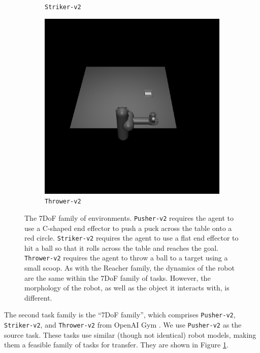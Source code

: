 \begin{subappendices}
\begin{figure}[h]
\begin{subfigure}[t]{0.3\textwidth}
    \caption{\texttt{Striker-v2}}
\end{subfigure}
\begin{subfigure}[t]{0.3\textwidth}
    \includegraphics[width=\textwidth]{figures/dyne/Thrower.png}
    \caption{\texttt{Thrower-v2}}
\end{subfigure}

\caption{The 7DoF family of environments. \texttt{Pusher-v2} requires the agent to use a C-shaped end effector to push a puck across the table onto a red circle. \texttt{Striker-v2} requires the agent to use a flat end effector to hit a ball so that it rolls across the table and reaches the goal. \texttt{Thrower-v2} requires the agent to throw a ball to a target using a small scoop.  As with the Reacher family, the dynamics of the robot are the same within the 7DoF family of tasks. However, the morphology of the robot, as well as the object it interacts with, is different.}
\label{fig:7dof_family}
\end{figure}

The second task family is the ``7DoF family'', which comprises \texttt{Pusher-v2}, \texttt{Striker-v2}, and  \texttt{Thrower-v2} from OpenAI Gym \citep{brockman2016openai}.
We use \texttt{Pusher-v2} as the source task.
These tasks use similar (though not identical) robot models, making them a feasible family of tasks for transfer.
They are shown in Figure \ref{fig:7dof_family}.


\end{subappendices}
